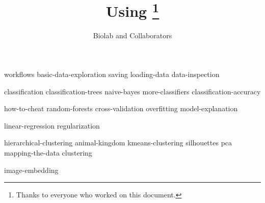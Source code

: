 \documentclass[symmetric, justified, a4paper]{tufte-book}
\title{Using \mutation\thanks{Thanks to everyone who worked on this document.}}
\author[Biolab and Collaborators]{Biolab and Collaborators}
\begin{document}
\frontmatter

\maketitle



\tableofcontents

% 

\mainmatter



{workflows}
{basic-data-exploration}
{saving}
{loading-data}
{data-inspection}


{classification}
{classification-trees}
{naive-bayes}
{more-classifiers}
{classification-accuracy}

{how-to-cheat}
{random-forests}
{cross-validation}
{overfitting}
{model-explanation}


{linear-regression}
{regularization}


{hierarchical-clustering}
{animal-kingdom}
{kmeans-clustering}
{silhouettes}
{pca}
{mapping-the-data}
{clustering}


{image-embedding}

\backmatter





\printindex
\end{document}
